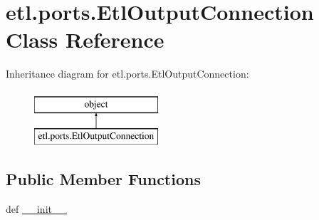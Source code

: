 \hypertarget{classetl_1_1ports_1_1EtlOutputConnection}{\section{etl.\-ports.\-Etl\-Output\-Connection Class Reference}
\label{classetl_1_1ports_1_1EtlOutputConnection}
}
Inheritance diagram for etl.\-ports.\-Etl\-Output\-Connection\-:\begin{figure}[H]
\begin{center}
\leavevmode
\includegraphics[height=2.000000cm]{classetl_1_1ports_1_1EtlOutputConnection}
\end{center}
\end{figure}
\subsection*{Public Member Functions}
\begin{DoxyCompactItemize}
\item 
def \hyperlink{classetl_1_1ports_1_1EtlOutputConnection_a1f26d4991f7787e9b8b83acb0aedfba7}{\-\_\-\-\_\-init\-\_\-\-\_\-}
\end{DoxyCompactItemize}
